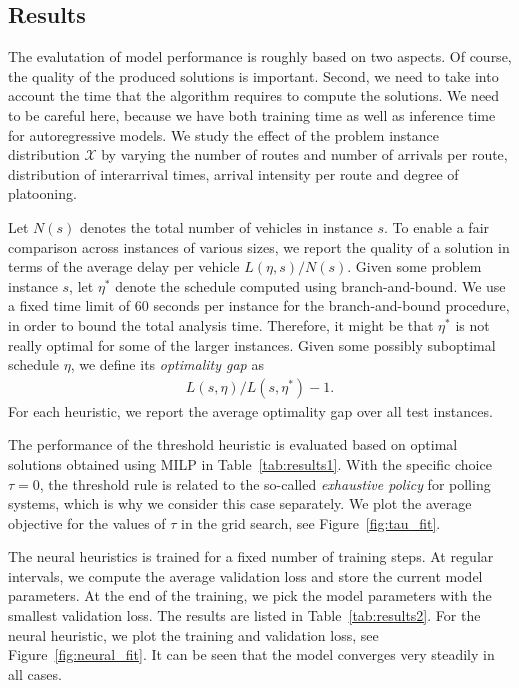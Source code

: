 \documentclass[a4paper]{article}
\theoremstyle{definition}
\theoremstyle{plain}
\begin{document}
\subsection{Results}

The evalutation of model performance is roughly based on two aspects. Of course,
the quality of the produced solutions is important. Second, we need to take into
account the time that the algorithm requires to compute the solutions. We need
to be careful here, because we have both training time as well as inference
time for autoregressive models.
%
We study the effect of the problem instance distribution $\mathcal{X}$ by
varying the number of routes and number of arrivals per route, distribution of
interarrival times, arrival intensity per route and degree of platooning.

Let $N(s)$ denotes the total number of vehicles in instance $s$. To enable a
fair comparison across instances of various sizes, we report the quality of a
solution in terms of the average delay per vehicle $L(\eta, s) / N(s)$.
%
Given some problem instance $s$, let $\eta^{*}$ denote the schedule computed
using branch-and-bound. We use a fixed time limit of 60 seconds per instance for
the branch-and-bound procedure, in order to bound the total analysis time.
Therefore, it might be that $\eta^{*}$ is not really optimal for some of the
larger instances. Given some possibly suboptimal schedule $\eta$, we define its
\textit{optimality gap} as
\begin{align*}
  L(s, \eta) / L(s, \eta^{*}) - 1 .
\end{align*}
For each heuristic, we report the average optimality gap over all test
instances.

The performance of the threshold heuristic is evaluated based on optimal
solutions obtained using MILP in Table~\ref{tab:results1}.
%
With the specific choice $\tau = 0$, the threshold rule is related to the
so-called \textit{exhaustive policy} for polling systems, which is why we
consider this case separately. We plot the average objective for the values of
$\tau$ in the grid search, see Figure~\ref{fig:tau_fit}.

The neural heuristics is trained for a fixed number of training steps. At
regular intervals, we compute the average validation loss and store the current
model parameters. At the end of the training, we pick the model parameters with
the smallest validation loss. The results are listed in Table~\ref{tab:results2}.
%
For the neural heuristic, we plot the training and validation loss, see
Figure~\ref{fig:neural_fit}. It can be seen that the model converges very steadily in all cases.
\end{document}
